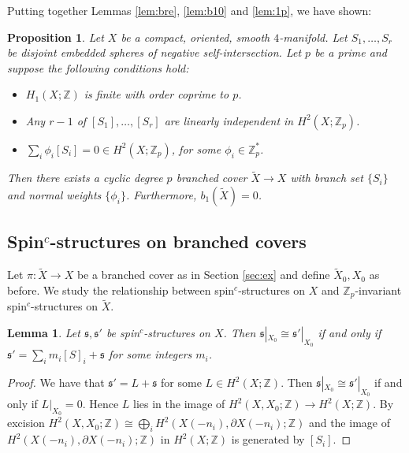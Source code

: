\documentclass{amsart}
\newtheorem{lemma}[theorem]{Lemma}
\newtheorem{proposition}[theorem]{Proposition}
\theoremstyle{definition}
\theoremstyle{remark}
\numberwithin{equation}{section}
\begin{document}
Putting together Lemmas \ref{lem:bre}, \ref{lem:b10} and \ref{lem:1p}, we have shown:

\begin{proposition}
Let $X$ be a compact, oriented, smooth $4$-manifold. Let $S_1, \dots , S_r$ be disjoint embedded spheres of negative self-intersection. Let $p$ be a prime and suppose the following conditions hold:
\begin{itemize}
\item[(1)]{$H_1(X ; \mathbb{Z})$ is finite with order coprime to $p$.}
\item[(2)]{Any $r-1$ of $[S_1] , \dots , [S_r]$ are linearly independent in $H^2(X ; \mathbb{Z}_p)$.}
\item[(3)]{$\sum_i \phi_i [S_i] = 0 \in H^2(X ; \mathbb{Z}_p)$, for some $\phi_i \in \mathbb{Z}_p^*$.}
\end{itemize}
Then there exists a cyclic degree $p$ branched cover $\widetilde{X} \to X$ with branch set $\{ S_i \}$ and normal weights $\{ \phi_i \}$. Furthermore, $b_1(\widetilde{X} ) = 0$.
\end{proposition}



\subsection{Spin$^c$-structures on branched covers}\label{sec:spinc}

Let $\pi : \widetilde{X} \to X$ be a branched cover as in Section \ref{sec:ex} and define $\widetilde{X}_0, X_0$ as before. We study the relationship between spin$^c$-structures on $X$ and $\mathbb{Z}_p$-invariant spin$^c$-structures on $\widetilde{X}$.

\begin{lemma}\label{lem:equiv}
Let $\mathfrak{s}, \mathfrak{s}'$ be spin$^c$-structures on $X$. Then $\mathfrak{s}|_{X_0} \cong \mathfrak{s}'|_{X_0}$ if and only if $\mathfrak{s}' = \sum_i m_i [S]_i + \mathfrak{s}$ for some integers $m_i$.
\end{lemma}
\begin{proof}
We have that $\mathfrak{s}' = L + \mathfrak{s}$ for some $L \in H^2(X ; \mathbb{Z})$. Then $\mathfrak{s}|_{X_0} \cong \mathfrak{s}'|_{X_0}$ if and only if $L|_{X_0} = 0$. Hence $L$ lies in the image of $H^2(X , X_0 ; \mathbb{Z}) \to H^2(X ; \mathbb{Z})$. By excision $H^2(X , X_0 ; \mathbb{Z}) \cong \bigoplus_i H^2( X(-n_i) , \partial X(-n_i) ; \mathbb{Z})$ and the image of $H^2(X(-n_i) , \partial X(-n_i) ; \mathbb{Z})$ in $H^2(X ; \mathbb{Z})$ is generated by $[S_i]$.
\end{proof}
\end{document}
